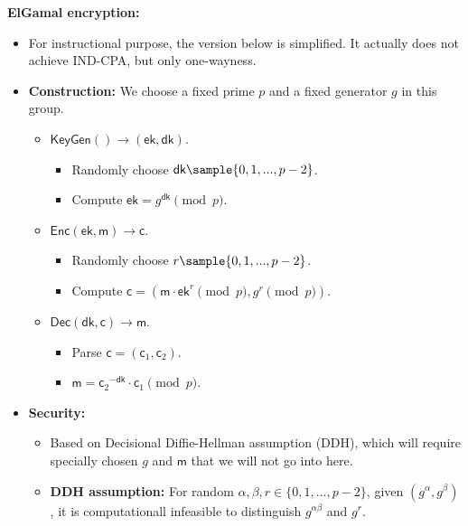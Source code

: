 \documentclass{article}
\newcommand{\msf}[1]{\mathsf{#1}}
\newcommand{\parhead}[1]{\noindent \textbf{#1}}
\begin{document}
\parhead{ElGamal encryption:}
\begin{itemize}
    \item For instructional purpose, the version below is simplified. It actually does not achieve IND-CPA, but only one-wayness.
    
    \item {\bf Construction:} We choose a fixed prime $p$ and a fixed generator $g$ in this group.
    \begin{itemize}
        \item $\msf{KeyGen}()\rightarrow(\msf{ek},\msf{dk})$.
        \begin{itemize}
            \item Randomly choose $\msf{dk}\sample\{0,1,...,p-2\}$.
            
            \item Compute $\msf{ek}=g^\msf{dk}\pmod{p}$.
        \end{itemize}
        
        \item $\msf{Enc}(\msf{ek},\msf{m})\rightarrow\msf{c}$.
        \begin{itemize}
            \item Randomly choose $r\sample\{0,1,...,p-2\}$.
            
            \item Compute $\msf{c}=(\msf{m}\cdot \msf{ek}^r\pmod{p},g^r\pmod{p})$.
        \end{itemize}
        
        \item $\msf{Dec}(\msf{dk},\msf{c})\rightarrow\msf{m}$.
        \begin{itemize}
            \item Parse $\msf{c}=(\msf{c}_1,\msf{c}_2)$.
            
            \item $\msf{m}={\msf{c}_2}^{-\msf{dk}}\cdot\msf{c}_1\pmod{p}$.
        \end{itemize}
    \end{itemize}
    
    \item {\bf Security:}
    \begin{itemize}
        \item Based on Decisional Diffie-Hellman assumption (DDH), which will require specially chosen $g$ and $\msf{m}$ that we will not go into here.
        
        \item {\bf DDH assumption:} For random $\alpha,\beta,r\in\{0,1,...,p-2\}$, given $(g^\alpha,g^\beta)$, it is computationall infeasible to distinguish $g^{\alpha\beta}$ and $g^r$. 
    \end{itemize}
\end{itemize}
\end{document}
